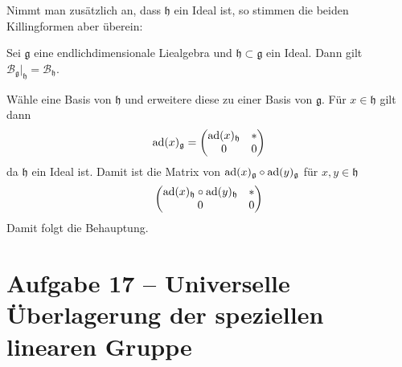 Nimmt man zusätzlich an, dass $\mathfrak{h}$ ein Ideal ist, so stimmen die beiden Killingformen aber überein:
\begin{lemma}
	Sei $\mathfrak{g}$ eine endlichdimensionale Liealgebra und $\mathfrak{h} \subset \mathfrak{g}$ ein Ideal.
	Dann gilt $\mathcal{B}_\mathfrak{g}\big|_{\mathfrak{h}} = \mathcal{B}_\mathfrak{h}$.
\end{lemma}
\begin{beweis}
	Wähle eine Basis von $\mathfrak{h}$ und erweitere diese zu einer Basis von $\mathfrak{g}$.
	Für $x \in \mathfrak{h}$ gilt dann
	\[
		\operatorname{ad}(x)_\mathfrak{g} = \begin{pmatrix}
			\operatorname{ad}(x)_\mathfrak{h} & * \\ 0 & 0
		\end{pmatrix}
	\]
	da $\mathfrak{h}$ ein Ideal ist.
	Damit ist die Matrix von $\operatorname{ad}(x)_\mathfrak{g} \circ \operatorname{ad}(y)_\mathfrak{g}$ für $x,y \in \mathfrak{h}$
	\[
		\begin{pmatrix}
			\operatorname{ad}(x)_\mathfrak{h} \circ \operatorname{ad}(y)_\mathfrak{h} & * \\ 0 & 0
		\end{pmatrix}
	\]
	Damit folgt die Behauptung.
\end{beweis}

\section{Aufgabe 17 -- Universelle Überlagerung der speziellen linearen Gruppe} %
\label{sec:aufg17}

